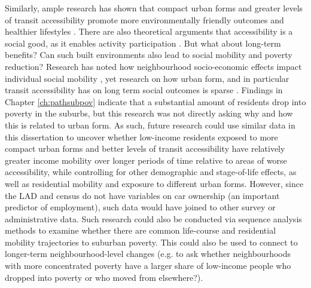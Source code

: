 Similarly, ample research has shown that compact urban forms and greater levels of transit accessibility promote more environmentally friendly outcomes and healthier lifestyles \cite{ewing_compactness_2015,ewing_travel_2010,cervero_travel_1997}. There are also theoretical arguments that accessibility is a social good, as it enables activity participation \cite{martens_transport_2016,pereira_distributive_2017}. But what about long-term benefits? Can such built environments also lead to social mobility and poverty reduction? Research has noted how neighbourhood socio-economic effects impact individual social mobility \cite{chetty_effects_2016}, yet research on how urban form, and in particular transit accessibility has on long term social outcomes is sparse \cite{ewing_does_2016,fransen_relationship_2019}. Findings in Chapter \ref{ch:pathsubpov} indicate that a substantial amount of residents drop into poverty in the suburbs, but this research was not directly asking why and how this is related to urban form. As such, future research could use similar data in this dissertation to uncover whether low-income residents exposed to more compact urban forms and better levels of transit accessibility have relatively greater income mobility over longer periods of time relative to areas of worse accessibility, while controlling for other demographic and stage-of-life effects, as well as residential mobility and exposure to different urban forms. However, since the LAD and census do not have variables on car ownership (an important predictor of employment), such data would have joined to other survey or administrative data. Such research could also be conducted via sequence analysis methods to examine whether there are common life-course and residential mobility trajectories to suburban poverty. This could also be used to connect to longer-term neighbourhood-level changes (e.g. to ask whether neighbourhoods with more concentrated poverty have a larger share of low-income people who dropped into poverty or who moved from elsewhere?). 

